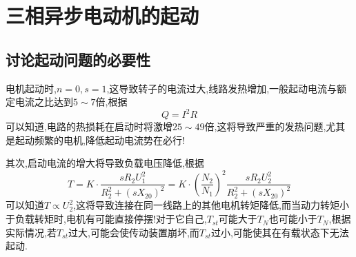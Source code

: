 \section{\K 三相异步电动机的起动}
\subsection{\K 讨论起动问题的必要性}
\Par 电机起动时,$n=0,s=1$,这导致转子的电流过大,线路发热增加,一般起动电流与额定电流之比达到$5\sim 7$倍,根据
\begin{equation*}
    Q=I^2R
\end{equation*}
可以知道,电路的热损耗在启动时将激增$25\sim 49$倍,这将导致严重的发热问题,尤其是起动频繁的电机,降低起动电流势在必行!

\Par 其次,启动电流的增大将导致负载电压降低,根据
\begin{equation*}
    T=K\cdot \frac{sR_2U_{1}^{2}}{R_{2}^{2}+\left( sX_{20} \right) ^2}=K\cdot \left( \frac{N_2}{N_1} \right) ^2\frac{sR_2U_{2}^{2}}{R_{2}^{2}+\left( sX_{20} \right) ^2}
\end{equation*}
可以知道$T\propto U_{2}^{2}$,这将导致连接在同一线路上的其他电机转矩降低,而当动力转矩小于负载转矩时,电机有可能直接停摆!对于它自己,$T_{st}$可能大于$T_N$也可能小于$T_N$,根据实际情况,若$T_{st}$过大,可能会使传动装置崩坏,而$T_{st}$过小,可能使其在有载状态下无法起动.

